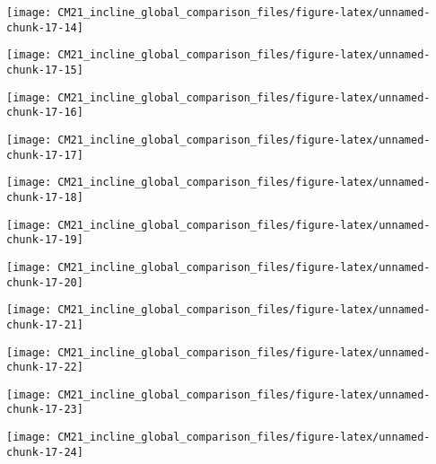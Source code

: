 \documentclass[
  10pt,
  a4paper,oneside]{article}
\begin{document}
\begin{center}\texttt{[image: CM21\_incline\_global\_comparison\_files/figure-latex/unnamed-chunk-17-14]} \end{center}

\begin{center}\texttt{[image: CM21\_incline\_global\_comparison\_files/figure-latex/unnamed-chunk-17-15]} \end{center}

\begin{center}\texttt{[image: CM21\_incline\_global\_comparison\_files/figure-latex/unnamed-chunk-17-16]} \end{center}

\begin{center}\texttt{[image: CM21\_incline\_global\_comparison\_files/figure-latex/unnamed-chunk-17-17]} \end{center}

\begin{center}\texttt{[image: CM21\_incline\_global\_comparison\_files/figure-latex/unnamed-chunk-17-18]} \end{center}

\begin{center}\texttt{[image: CM21\_incline\_global\_comparison\_files/figure-latex/unnamed-chunk-17-19]} \end{center}

\begin{center}\texttt{[image: CM21\_incline\_global\_comparison\_files/figure-latex/unnamed-chunk-17-20]} \end{center}

\begin{center}\texttt{[image: CM21\_incline\_global\_comparison\_files/figure-latex/unnamed-chunk-17-21]} \end{center}

\begin{center}\texttt{[image: CM21\_incline\_global\_comparison\_files/figure-latex/unnamed-chunk-17-22]} \end{center}

\begin{center}\texttt{[image: CM21\_incline\_global\_comparison\_files/figure-latex/unnamed-chunk-17-23]} \end{center}

\begin{center}\texttt{[image: CM21\_incline\_global\_comparison\_files/figure-latex/unnamed-chunk-17-24]} \end{center}
\end{document}
